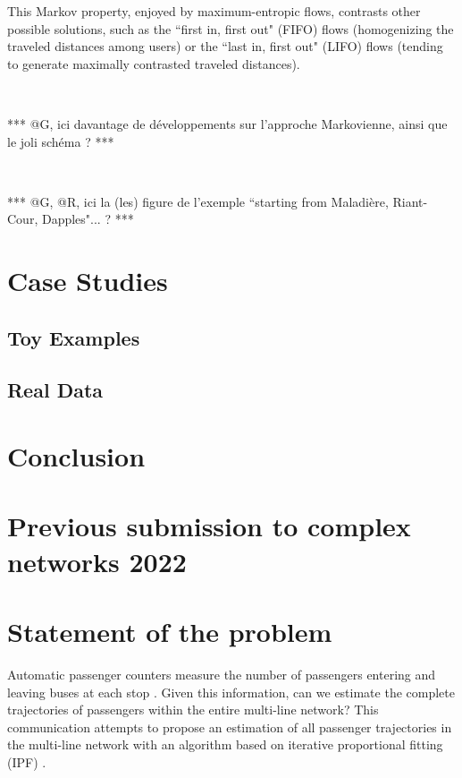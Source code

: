 \documentclass{bmcart}
\begin{document}
This Markov property, enjoyed by maximum-entropic flows, contrasts other possible solutions, such as  the ``first in, first out" (FIFO) flows (homogenizing the 
traveled distances among users) or the ``last in, first out" (LIFO) flows (tending to generate maximally  contrasted traveled distances).

\


***  @G, ici davantage de développements sur l'approche Markovienne, ainsi que le joli schéma ?  ***


\

*** @G, @R, ici la (les) figure de l'exemple  ``starting from Maladière, Riant-Cour, Dapples"... ? ***

 

\section{Case Studies}


\subsection{Toy Examples}

\subsection{Real Data}


\section{Conclusion}

  
\newpage

\section*{Previous submission to complex networks 2022}

%
\section*{Statement of the problem}
%

Automatic passenger counters measure the number of passengers entering and leaving buses at each stop \cite{boyle_passenger_1998}. Given this information, can we estimate the complete trajectories of passengers within the entire multi-line network? This communication attempts to propose an estimation of all passenger trajectories in the multi-line network with an algorithm based on iterative proportional fitting (IPF) \cite{bishop_discrete_2007}.
\end{document}
